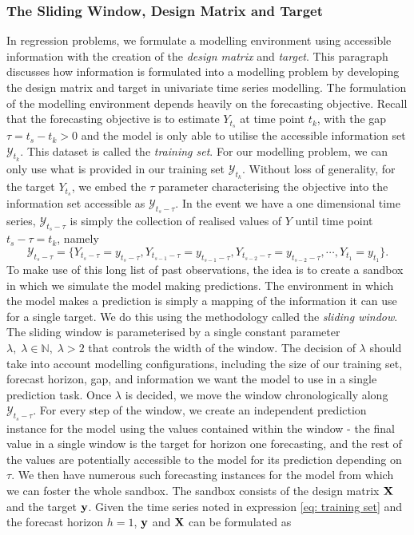 \subsubsection{The Sliding Window, Design Matrix and Target}
In regression problems, we formulate a modelling environment using accessible information with the creation of the \textit{design matrix} and \textit{target}. This paragraph discusses how information is formulated into a modelling problem by developing the design matrix and target in univariate time series modelling. The formulation of the modelling environment depends heavily on the forecasting objective. Recall that the forecasting objective is to estimate $Y_{t_s}$ at time point $t_k$, with the gap $\tau = t_s - t_k > 0$ and the model is only able to utilise the accessible information set $\mathcal{Y}_{t_k}$. This dataset is called the \textit{training set}. For our modelling problem, we can only use what is provided in our training set $\mathcal{Y}_{t_k}$. Without loss of generality, for the target $Y_{t_s}$, we embed the $\tau$ parameter characterising the objective into the information set accessible as $\mathcal{Y}_{t_s - \tau}$. In the event we have a one dimensional time series, $\mathcal{Y}_{t_s-\tau}$ is simply the collection of realised values of $Y$ until time point $t_s-\tau = t_k$, namely
\begin{equation}\label{eq: training set}
    \mathcal{Y}_{t_s-\tau} = \{ Y_{t_s-\tau} = y_{t_s-\tau}, Y_{t_{s-1}-\tau} = y_{t_{s-1}-\tau}, Y_{t_{s-2}-\tau} = y_{t_{s-2}-\tau}, \cdots, Y_{t_1} = y_{t_1} \}.
\end{equation}
To make use of this long list of past observations, the idea is to create a sandbox in which we simulate the model making predictions. The environment in which the model makes a prediction is simply a mapping of the information it can use for a single target. We do this using the methodology called the \textit{sliding window}. The sliding window is parameterised by a single constant parameter $\lambda, \; \lambda \in \mathbb{N}, \; \lambda > 2$ that controls the width of the window. The decision of $\lambda$ should take into account modelling configurations, including the size of our training set, forecast horizon, gap, and information we want the model to use in a single prediction task. Once $\lambda$ is decided, we move the window chronologically along $\mathcal{Y}_{t_s -\tau}$. For every step of the window, we create an independent prediction instance for the model using the values contained within the window - the final value in a single window is the target for horizon one forecasting, and the rest of the values are potentially accessible to the model for its prediction depending on $\tau$. We then have numerous such forecasting instances for the model from which we can foster the whole sandbox. The sandbox consists of the design matrix $\mathbf{X}$ and the target $\mathbf{y}$. Given the time series noted in expression \ref{eq: training set} and the forecast horizon $h=1$, $\mathbf{y}$ and $\mathbf{X}$ can be formulated as
